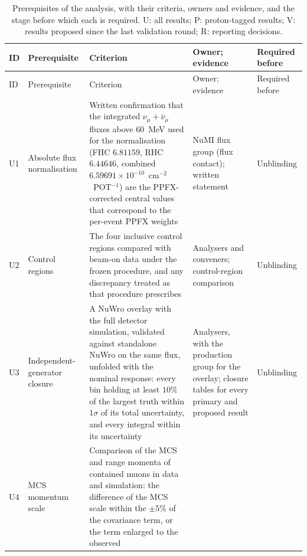 {\footnotesize\setlength{\tabcolsep}{4pt}
\setlength{\LTcapwidth}{\textwidth}
\begin{longtable}{@{}p{0.6cm}p{2.5cm}p{5.9cm}p{2.8cm}p{2.4cm}@{}}
\caption{Prerequisites of the analysis, with their criteria, owners and evidence, and the stage before
  which each is required. U: all results; P: proton-tagged results; V: results proposed since the last
  validation round; R: reporting decisions.}
\label{tab:prerequisites}\\
\toprule
ID & Prerequisite & Criterion & Owner; evidence & Required before \\
\midrule
\endfirsthead
\toprule
ID & Prerequisite & Criterion & Owner; evidence & Required before \\
\midrule
\endhead
\bottomrule
\endfoot
U1 & Absolute flux normalisation &
  Written confirmation that the integrated $\nu_\mu+\bar\nu_\mu$ fluxes above $60$~MeV used for the
  normalisation (FHC $6.81159$, RHC $6.44646$, combined $6.59691\times10^{-10}$~cm$^{-2}$~POT$^{-1}$) are the
  PPFX-corrected central values that correspond to the per-event PPFX weights &
  NuMI flux group (flux contact); written statement & Unblinding \\
U2 & Control regions &
  The four inclusive control regions compared with beam-on data under the frozen procedure, and any
  discrepancy treated as that procedure prescribes &
  Analysers and conveners; control-region comparison & Unblinding \\
U3 & Independent-generator closure &
  A NuWro overlay with the full detector simulation, validated against standalone NuWro on the same flux,
  unfolded with the nominal response: every bin holding at least $10\%$ of the largest truth within
  $1\sigma$ of its total uncertainty, and every integral within its uncertainty &
  Analysers, with the production group for the overlay; closure tables for every primary and proposed
  result & Unblinding \\
U4 & MCS momentum scale &
  Comparison of the MCS and range momenta of contained muons in data and simulation: the difference of
  the MCS scale within the $\pm5\%$ of the covariance term, or the term enlarged to the observed

\end{longtable}}
